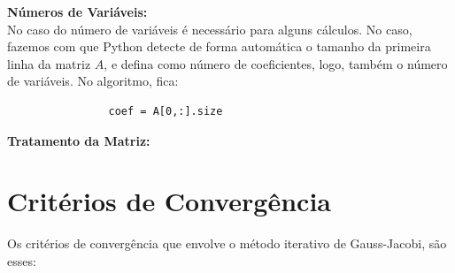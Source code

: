 \documentclass[
12pt,				%
openright,			%
twoside,			%
a4paper,			%
english,			%
french,				%
spanish,			%
brazil				%
]{abntex2_new}
\begin{document}
\begin{alineas}
{			}
			
			\item{\textbf{Números de Variáveis:}\\
				No caso do número de variáveis é necessário para alguns cálculos. No caso,
				fazemos 
				com que Python detecte de forma automática o tamanho da primeira linha da matriz
				$A$, 
				e defina como número de coeficientes, logo, também o número de variáveis. No
				algoritmo, fica:
				\begin{lstlisting}
				coef = A[0,:].size\end{lstlisting}
			}
			
			\item{\textbf{Tratamento da Matriz:}\\
				
				
			}
			
		\end{alineas}
		
		
		
		
		\section{Critérios de Convergência}
		Os critérios de convergência que envolve o método iterativo de Gauss-Jacobi, são
		esses:
		
\end{document}
